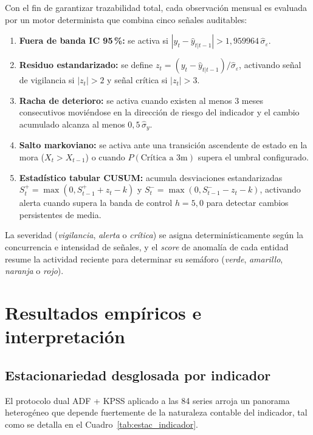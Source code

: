 \documentclass[11pt,letterpaper]{article}
\begin{document}
Con el fin de garantizar trazabilidad total, cada observación mensual es evaluada por un motor determinista que combina cinco señales auditables:
\begin{enumerate}[leftmargin=1.5em]
  \item \textbf{Fuera de banda IC 95\,\%:} se activa si \(|y_t - \hat{y}_{t|t-1}| > 1{,}959964\,\hat{\sigma}_\varepsilon\).
  \item \textbf{Residuo estandarizado:} se define \(z_t = (y_t - \hat{y}_{t|t-1})/\hat{\sigma}_\varepsilon\), activando señal de vigilancia si \(|z_t| > 2\) y señal crítica si \(|z_t| > 3\).
  \item \textbf{Racha de deterioro:} se activa cuando existen al menos 3 meses consecutivos moviéndose en la dirección de riesgo del indicador y el cambio acumulado alcanza al menos \(0{,}5\,\hat{\sigma}_y\).
  \item \textbf{Salto markoviano:} se activa ante una transición ascendente de estado en la mora (\(X_t > X_{t-1}\)) o cuando \(P(\text{Crítica a 3m})\) supera el umbral configurado.
  \item \textbf{Estadístico tabular CUSUM:} acumula desviaciones estandarizadas \(S_t^+ = \max(0, S_{t-1}^+ + z_t - k)\) y \(S_t^- = \max(0, S_{t-1}^- - z_t - k)\), activando alerta cuando supera la banda de control \(h = 5{,}0\) para detectar cambios persistentes de media.
\end{enumerate}

La severidad (\emph{vigilancia}, \emph{alerta} o \emph{crítica}) se asigna determinísticamente según la concurrencia e intensidad de señales, y el \emph{score} de anomalía de cada entidad resume la actividad reciente para determinar su semáforo (\emph{verde}, \emph{amarillo}, \emph{naranja} o \emph{rojo}).

\section{Resultados empíricos e interpretación}

\subsection{Estacionariedad desglosada por indicador}

El protocolo dual ADF + KPSS aplicado a las 84 series arroja un panorama heterogéneo que depende fuertemente de la naturaleza contable del indicador, tal como se detalla en el Cuadro~\ref{tab:estac_indicador}.
\end{document}
